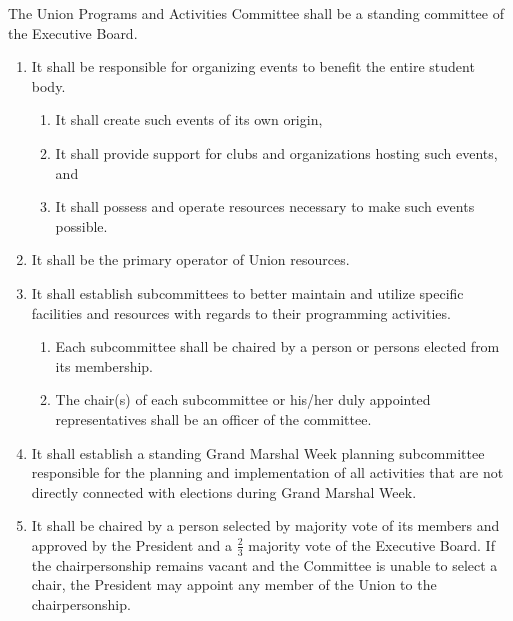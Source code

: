 \item The Union Programs and Activities Committee shall be a standing committee of the Executive Board.
\begin{enumerate}

    \item It shall be responsible for organizing events to benefit the entire student body.
    \begin{enumerate}
        \item It shall create such events of its own origin,
        \item It shall provide support for clubs and organizations hosting such events, and
        \item It shall possess and operate resources necessary to make such events possible.
    \end{enumerate}

    \item It shall be the primary operator of Union resources.

    \item It shall establish subcommittees to better maintain and utilize specific facilities and resources with regards to their programming activities.
    \begin{enumerate}
        \item Each subcommittee shall be chaired by a person or persons elected from its membership.
        \item The chair(s) of each subcommittee or his/her duly appointed representatives shall be an officer of the committee.
    \end{enumerate}

    \item It shall establish a standing Grand Marshal Week planning subcommittee responsible for the planning and implementation of all activities that are not directly connected with elections during Grand Marshal Week.

    \item It shall be chaired by a person selected by majority vote of its members and approved by the President and a $\frac{2}{3}$ majority vote of the Executive Board. If the chairpersonship remains vacant and the Committee is unable to select a chair, the President may appoint any member of the Union to the chairpersonship.

\end{enumerate}
